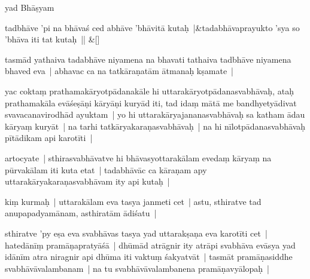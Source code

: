 \documentclass[article,12pt,a4paper]{memoir}%
\newcounter{parCount}
\begin{document}
	  
	  \pstart \leavevmode%
	\label{thakur75-76.25}yad Bhāṣyam
	{}
	\pend%
      
	    
	    \stanza[\smallbreak]
	  tadbhāve 'pi na bhāvaś ced abhāve 'bhāvitā kutaḥ |&tadabhāvaprayukto 'sya so 'bhāva iti tat kutaḥ || \&[\smallbreak]
	  
	  
	  

	  
	  \pstart \leavevmode%
	\label{thakur75-76.28}tasmād yathaiva tadabhāve niyamena na bhavati tathaiva tadbhāve niyamena bhaved eva | abhavac ca na tatkāraṇatām ātmanaḥ kṣamate |
	{}
	\pend%
      

	  
	  \pstart \leavevmode%
	\label{thakur75-77.1}yac coktaṃ prathamakāryotpādanakāle hi uttarakāryotpādanasvabhāvaḥ, ataḥ prathamakāla evāśeṣāṇi kāryāṇi kuryād iti, tad idaṃ mātā me bandhyetyādivat svavacanavirodhād ayuktam | yo hi uttarakāryajananasvabhāvaḥ sa katham ādau kāryaṃ kuryāt | na tarhi tatkāryakaraṇasvabhāvaḥ | na hi nīlotpādanasvabhāvaḥ pītādikam api karotīti |
	{}
	\pend%
      

	  
	  \pstart \leavevmode%
	\label{thakur75-77.6}artocyate | sthirasvabhāvatve hi bhāvasyottarakālam evedaṃ kāryaṃ na pūrvakālam iti kuta etat | tadabhāvāc ca kāraṇam apy uttarakāryakaraṇasvabhāvam ity api kutaḥ | 
	{}
	\pend%
      

	  
	  \pstart \leavevmode%
	\label{thakur75-77.8}kiṃ kurmaḥ | uttarakālam eva tasya janmeti cet | astu, sthiratve tad anupapadyamānam, asthiratām ādiśatu |
	{}
	\pend%
      

	  
	  \pstart \leavevmode%
	\label{thakur75-77.10}sthiratve 'py eṣa eva svabhāvas tasya yad uttarakṣaṇa eva karotīti cet | hatedānīṃ pramāṇapratyāśā | dhūmād atrāgnir ity atrāpi svabhāva evāsya yad idānīm atra niragnir api dhūma iti vaktuṃ śakyatvāt | tasmāt pramāṇasiddhe svabhāvāvalambanam | na tu svabhāvāvalambanena pramāṇavyālopaḥ | 
	{}
	\pend%
      
\end{document}
